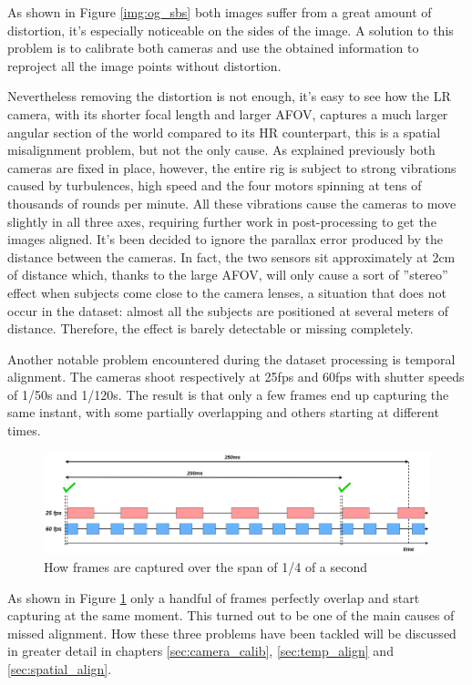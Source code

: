 As shown in Figure \ref{img:og_sbs} both images suffer from a great amount of distortion, it's especially noticeable on the sides of the image. A solution to this problem is to calibrate both cameras and use the obtained information to reproject all the image points without distortion.

Nevertheless removing the distortion is not enough, it's easy to see how the LR camera, with its shorter focal length and larger AFOV, captures a much larger angular section of the world compared to its HR counterpart, this is a spatial misalignment problem, but not the only cause. As explained previously both cameras are fixed in place, however, the entire rig is subject to strong vibrations caused by turbulences, high speed and the four motors spinning at tens of thousands of rounds per minute. All these vibrations cause the cameras to move slightly in all three axes, requiring further work in post-processing to get the images aligned.
It's been decided to ignore the parallax error produced by the distance between the cameras. In fact, the two sensors sit approximately at 2cm of distance which, thanks to the large AFOV, will only cause a sort of ”stereo” effect when subjects come close to the camera lenses, a situation that does not occur in the dataset: almost
all the subjects are positioned at several meters of distance. Therefore, the effect is barely detectable or missing completely.\newline

Another notable problem encountered during the dataset processing is temporal alignment. The cameras shoot respectively at 25fps and 60fps with shutter speeds of 1/50s and 1/120s. The result is that only a few frames end up capturing the same instant, with some partially overlapping and others starting at different times.

\begin{figure}[h]
  \centering
  \includegraphics[width=1\textwidth]{figures/temporal_align_3.png}
  \caption{How frames are captured over the span of 1/4 of a second}
  \label{img:temp_align}
\end{figure}

As shown in Figure \ref{img:temp_align} only a handful of frames perfectly overlap and start capturing at the same moment. This turned out to be one of the main causes of missed alignment.
How these three problems have been tackled will be discussed in greater detail in chapters \ref{sec:camera_calib}, \ref{sec:temp_align} and \ref{sec:spatial_align}.

